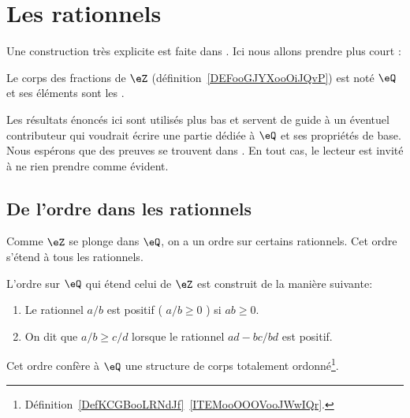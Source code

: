 \section{Les rationnels}

Une construction très explicite est faite dans \cite{RWWJooJdjxEK}. Ici nous allons prendre plus court :
\begin{definition}
    Le corps des fractions de \( \eZ\) (définition~\ref{DEFooGJYXooOiJQvP}) est noté \( \eQ\) et ses éléments sont les .
\end{definition}

Les résultats énoncés ici sont utilisés plus bas et servent de guide à un éventuel contributeur qui voudrait écrire une partie dédiée à \( \eQ\) et ses propriétés de base. Nous espérons que des preuves se trouvent dans \cite{RWWJooJdjxEK}. En tout cas, le lecteur est invité à ne rien prendre comme évident.

\subsection{De l'ordre dans les rationnels}
Comme \( \eZ \) se plonge dans \( \eQ \), on a un ordre sur certains rationnels. Cet ordre s'étend à tous les rationnels.
\begin{propositionDef}
  L'ordre sur \( \eQ \) qui étend celui de \( \eZ \) est construit de la manière suivante:
  \begin{enumerate}
  \item Le rationnel \( a/b \) est positif ( \(a/b \geq 0 \) ) si \( ab \geq 0 \). 
  \item On dit que \( a/b \geq c/d \)  lorsque le rationnel \( ad - bc / bd \) est positif. 
  \end{enumerate}
  Cet ordre confère à \(\eQ \) une structure de corps totalement ordonné\footnote{Définition~\ref{DefKCGBooLRNdJf}~\ref{ITEMooOOOVooJWwIQr}.}.
\end{propositionDef}

